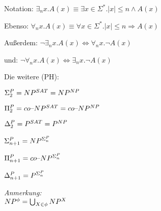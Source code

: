 




\begin{definition}
    


    Notation: $\exists_n x . A(x) \equiv \exists x \in \Sigma^\ast . |x| \leq n \land A(x)$

    Ebenso: $\forall_n x . A(x) \equiv \forall x \in \Sigma^\ast . |x| \leq n \Rightarrow A(x)$

    Außerdem: $\neg \exists_n x . A(x) \Leftrightarrow \forall_n x . \neg A(x)$

    und: $\neg \forall_n x . A(x) \Leftrightarrow \exists_n x . \neg A(x)$

\end{definition}




\begin{definition}
    
    Die weitere  (PH):

    $\Sigma_2^{P} = NP^{SAT} = NP^{NP}$

    $\Pi_2^{P} = co\text{--}NP^{SAT} = co\text{--}NP^{NP}$

    $\Delta_2^{P} = P^{SAT} = P^{NP}$

    $\Sigma_{n+1}^{P} = NP^{\Sigma_n^{P}}$

    $\Pi_{n+1}^{P} = co\text{--}NP^{\Sigma_n^{P}}$

    $\Delta_{n+1}^{P} = P^{\Sigma_n^{P}}$

    \textit{Anmerkung:}\\
    $NP^\phi = \bigcup_{X \in \phi} NP^X$


\end{definition}



